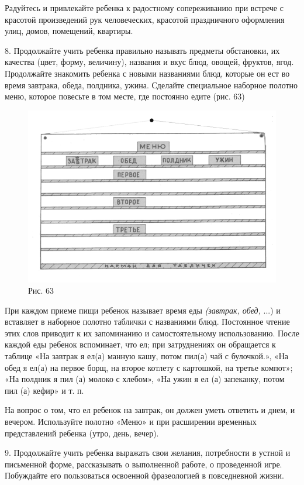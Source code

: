 \documentclass[a5paper]{book}
\renewcommand{\emph}[1]{\textit{#1}}
\begin{document}
Радуйтесь и привлекайте ребенка к радостному сопереживанию при встрече с
красотой произведений рук человеческих, красотой праздничного оформления
улиц, домов, помещений, квартиры.

8. Продолжайте учить ребенка правильно называть предметы обстановки, их
качества (цвет, форму, величину), названия и вкус блюд, овощей, фруктов,
ягод. Продолжайте знакомить ребенка с новыми названиями блюд, которые он
ест во время завтрака, обеда, полдника, ужина. Сделайте специальное
наборное полотно меню, которое повесьте в том месте, где постоянно едите
(рис. 63)

\begin{figure}
\centering
\includegraphics[width=\linewidth]{media/media/image60.png}
\caption*{Рис. 63}
\end{figure}

При каждом приеме пищи ребенок называет время еды \emph{(завтрак, обед,}
...) и вставляет в наборное полотно таблички с названиями блюд.
Постоянное чтение этих слов приводит к их запоминанию и самостоятельному
использованию. После каждой еды ребенок вспоминает, что ел; при
затруднениях он обращается к таблице «На завтрак я ел(а) манную кашу,
потом пил(а) чай с булочкой.», «На обед я ел(а) на первое борщ, на
второе котлету с картошкой, на третье компот»; «На полдник я пил (а)
молоко с хлебом», «На ужин я ел (а) запеканку, потом пил (а) кефир» и т.
п.

На вопрос о том, что ел ребенок на завтрак, он должен уметь ответить и
днем, и вечером. Используйте полотно «Меню» и при расширении временных
представлений ребенка (утро, день, вечер).

9. Продолжайте учить ребенка выражать свои желания, потребности в устной
и письменной форме, рассказывать о выполненной работе, о проведенной
игре. Побуждайте его пользоваться освоенной фразеологией в повседневной
жизни.
\end{document}

